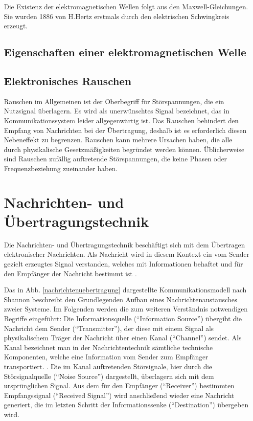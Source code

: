 Die Existenz der elektromagnetischen Wellen folgt aus den Maxwell-Gleichungen. Sie wurden 1886 von H.Hertz erstmals durch den elektrischen Schwingkreis erzeugt.

\subsection{Eigenschaften einer elektromagnetischen Welle}
\subsection{Elektronisches Rauschen}
Rauschen im Allgemeinen ist der Oberbegriff für Störspannungen, die ein Nutzsignal überlagern. Es wird als unerwünschtes Signal bezeichnet, das in Kommunikationssystem leider allgegenwärtig ist. Das Rauschen behindert den Empfang von Nachrichten bei der Übertragung, deshalb ist es erforderlich diesen Nebeneffekt zu begrenzen. Rauschen kann mehrere Ursachen haben, die alle durch physikalische Gesetzmäßigkeiten begründet werden können. Üblicherweise sind  Rauschen zufällig auftretende Störspannungen, die keine  Phasen oder Frequenzbeziehung zueinander haben.

\newpage
\section{Nachrichten- und Übertragungstechnik}
Die Nachrichten- und Übertragungstechnik beschäftigt sich mit dem Übertragen elektronischer Nachrichten. Als Nachricht wird in diesem Kontext ein vom Sender gezielt erzeugtes Signal verstanden, welches mit Informationen behaftet und für den Empfänger der Nachricht bestimmt ist \cite[vgl. Werner, S. 3]{Werner:2006}.

Das in Abb. \ref{nachrichtenuebertragung} dargestellte Kommunikationsmodell nach Shannon beschreibt den Grundlegenden Aufbau eines Nachrichtenaustausches zweier Systeme. 
Im Folgenden werden die zum weiteren Verständnis notwendigen Begriffe eingeführt:\newline
Die Informationsquelle (\enquote{Information Source}) übergibt die Nachricht dem Sender (\enquote{Transmitter}), der diese mit einem Signal als physikalischem Träger der Nachricht über einen Kanal (\enquote{Channel}) sendet. \newline
Als Kanal bezeichnet man in der Nachrichtentechnik sämtliche technische Komponenten, welche eine Information vom Sender zum Empfänger transportiert. \cite[vgl. Dankmeier, S. 13]{Dankmeier:2017}.\newline
Die im Kanal auftretenden Störsignale, hier durch die Störsignalquelle (\enquote{Noise Source}) dargestellt, überlagern sich mit dem ursprünglichen Signal. Aus dem für den Empfänger (\enquote{Receiver}) bestimmten Empfangssignal (\enquote{Received Signal}) wird anschließend wieder eine Nachricht generiert, die im letzten Schritt der Informationssenke (\enquote{Destination}) übergeben wird.


